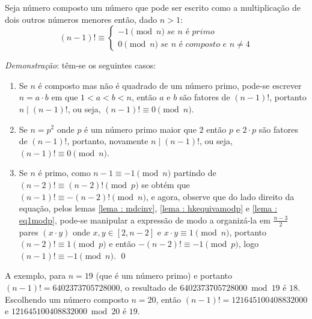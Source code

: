 \begin{teorema} \label{teorema : wilson}
    Seja número composto um número que pode ser escrito como a multiplicação de dois outros números menores então, dado $n > 1$:
    \begin{equation*}
        (n - 1)! \equiv \begin{cases}
                        -1 \pmod{n} \; \textit{se $n$ é primo} \\
                        0 \pmod{n} \; \textit{se $n$ é composto e $n \neq 4$}
                        \end{cases}
    \end{equation*}
\end{teorema}
\noindent
\textit{Demonstração}: têm-se os seguintes casos:
\begin{enumerate}
    \item Se $n$ é composto mas não é quadrado de um número primo, pode-se escrever $n = a \cdot b$ em que $1 < a < b < n$, então $a$ e $b$ são fatores de $(n-1)!$, portanto $n \mid (n-1)!$, ou seja, $(n-1)! \equiv 0 \pmod{n}$.

    \item Se $n = p^2$ onde $p$ é um número primo maior que $2$ então $p$ e $2 \cdot p$ são fatores de $(n-1)!$, portanto, novamente $n \mid (n-1)!$, ou seja, $(n-1)! \equiv 0 \pmod{n}$.

    \item \label{item:caso3wilson} Se $n$ é primo, como $n - 1 \equiv -1 \pmod{n}$ partindo de $(n-2)! \equiv (n-2)! \pmod{p}$ se obtém que $(n-1)! \equiv -(n-2)! \pmod{n}$, e agora, observe que do lado direito da equação, pelos lemas \ref{lema : mdcinv}, \ref{lema : hkequivamodp} e \ref{lema : eq1modp}, pode-se manipular a expressão de modo a organizá-la em $\frac{n-3}{2}$ pares $(x \cdot y)$ onde $x, y \in [2, n-2]$ e                      $x \cdot y \equiv 1 \pmod{n}$, portanto $(n-2)! \equiv 1 \pmod{p}$ e então $-(n-2)! \equiv -1 \pmod{p}$, logo $(n-1)! \equiv -1 \pmod{n}$.
\qed
\end{enumerate}

A exemplo, para $n = 19$ (que é um número primo) e portanto $(n - 1)! = 6402373705728000$, o resultado de $6402373705728000 \bmod{19}$ é $18$. Escolhendo um número composto $n = 20$, então $(n - 1)! = 121645100408832000$ e $121645100408832000 \bmod{20}$ é $19$.

